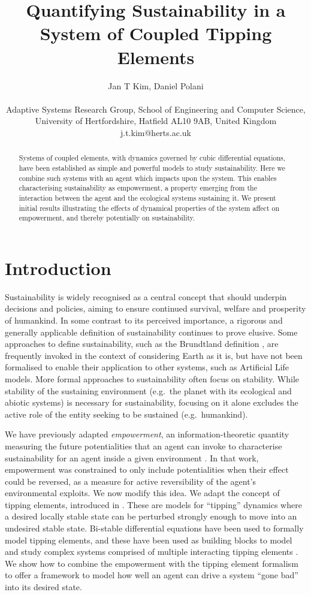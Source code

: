 \documentclass[letterpaper]{article}
\title{Quantifying Sustainability in a System of Coupled Tipping Elements}
\author{Jan T Kim, Daniel Polani \\
\mbox{}\\
Adaptive Systems Research Group, School of Engineering and
Computer Science, \\
University of Hertfordshire, Hatfield AL10 9AB,
United Kingdom \\
j.t.kim@herts.ac.uk} %
\begin{document}
\maketitle

\begin{abstract}
Systems of coupled elements, with dynamics governed by cubic
differential equations, have been established as simple and powerful
models to study sustainability. Here we combine such systems with an
agent which impacts upon the system. This enables characterising
sustainability as empowerment, a property emerging from the
interaction between the agent and the ecological systems sustaining
it. We present initial results illustrating the effects of dynamical
properties of the system affect on empowerment, and thereby
potentially on sustainability.
\end{abstract}


\section{Introduction}

Sustainability is widely recognised as a central concept that should
underpin decisions and policies, aiming to ensure continued survival,
welfare and prosperity of humankind. In some contrast to its perceived
importance, a rigorous and generally applicable definition of
sustainability continues to prove elusive. Some approaches to define
sustainability, such as the Brundtland definition
\citep{Brundlandcommission1987}, are frequently invoked in the context
of considering Earth as it is, but have not been formalised to enable
their application to other systems, such as Artificial Life models.
More formal approaches to sustainability often focus on stability.
While stability of the sustaining environment (e.g.\ the planet with
its ecological and abiotic systems) is necessary for
sustainability, focusing on it alone excludes the active role of the
entity seeking to be sustained (e.g.\ humankind).

We have previously adapted \emph{empowerment}, an
information-theoretic quantity measuring the future potentialities
that an agent can invoke to characterise sustainability for an agent
inside a given environment \citep{Kim2009_sustainability}. In that
work, empowerment was constrained to only include potentialities when
their effect could be reversed, as a measure for active reversibility
of the agent's environmental exploits. We now modify this idea. We
adapt the concept of tipping elements, introduced in
\citep{Lenton2008_tippingelements}. These are models for ``tipping''
dynamics where a desired locally stable state can be perturbed strongly
enough to move into an undesired stable state.  Bi-stable differential
equations have been used to formally model tipping elements, and these
have been used as building blocks to model and study complex systems
comprised of multiple interacting tipping elements
\citep{Brummitt2015_coupledcatastrophes,Klose2019_interactingtippingelements}.
We show how to combine the empowerment with the tipping element
formalism to offer a framework to model how well an agent can drive a
system ``gone bad'' into its desired state.
\end{document}
